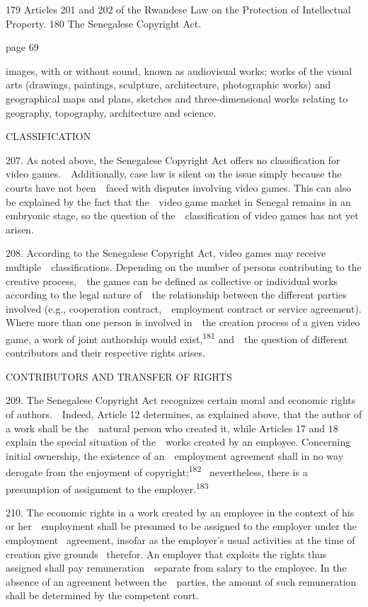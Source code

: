 \documentclass[
]{article}
\begin{document}
{179 }{Articles 201 and 202 of the Rwandese }{Law on the Protection of
Intellectual Property}{. }{180 }{The Senegalese }{Copyright Act}{.}

{page 69}

{images, with or without sound, known as audiovisual works; works of the
visual arts (drawings, paintings, sculpture, architecture, photographic
works) and geographical maps and plans, sketches and three-dimensional
works relating to geography, topography, architecture and science.}

{CLASSIFICATION}

{207. }{As noted above, the Senegalese }{Copyright Act }{offers no
classification for video games.~~Additionally, case law is silent on the
issue simply because the courts have not been~~faced with disputes
involving video games. This can also be explained by the fact that
the~~video game market in Senegal remains in an embryonic stage, so the
question of the~~classification of video games has not yet arisen.}

{208. }{According to the Senegalese }{Copyright Act}{, video games may
receive multiple~~classifications. Depending on the number of persons
contributing to the creative process,~~the games can be defined as
collective or individual works according to the legal nature of~~the
relationship between the different parties involved (e.g., cooperation
contract,~~employment contract or service agreement). Where more than
one person is involved in~~the creation process of a given video game, a
work of joint authorship would exist,}\textsuperscript{{181 }}{and~~the
question of different contributors and their respective rights arises.}

{CONTRIBUTORS AND TRANSFER OF RIGHTS}

{209. }{The Senegalese }{Copyright Act }{recognizes certain moral and
economic rights of authors.~~Indeed, Article 12 determines, as explained
above, that the author of a work shall be the~~natural person who
created it, while Articles 17 and 18 explain the special situation of
the~~works created by an employee. Concerning initial ownership, the
existence of an~~employment agreement shall in no way derogate from the
enjoyment of copyright;}\textsuperscript{{182 }}{~nevertheless, there is
a presumption of assignment to the employer.}\textsuperscript{{183}}

{210. }{The economic rights in a work created by an employee in the
context of his or her~~employment shall be presumed to be assigned to
the employer under the employment }{~agreement, insofar as the
employer's usual activities at the time of creation give grounds
}{~therefor. An employer that exploits the rights thus assigned shall
pay remuneration~~separate from salary to the employee. In the absence
of an agreement between the~~parties, the amount of such remuneration
shall be determined by the competent court.}
\end{document}
